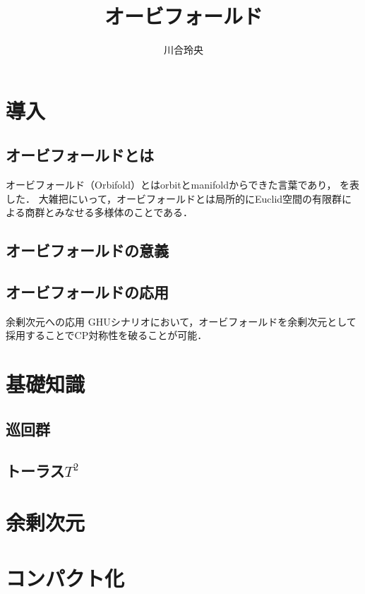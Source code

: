 \documentclass[dvipdfmx,uplatex]{jsarticle}
\numberwithin{theorem}{section}
\numberwithin{reibangou}{section}
\numberwithin{reidaibangou}{section}
\numberwithin{mondaibangou}{section}
\begin{document}
\title{オービフォールド}
\author{川合玲央}

\maketitle

\tableofcontents

\section{導入}

\subsection{オービフォールドとは}
オービフォールド（Orbifold）とはorbitとmanifoldからできた言葉であり，
を表した．
大雑把にいって，オービフォールドとは局所的にEuclid空間の有限群による商群とみなせる多様体のことである．

\subsection{オービフォールドの意義}

\subsection{オービフォールドの応用}
余剰次元への応用
GHUシナリオにおいて，オービフォールドを余剰次元として採用することでCP対称性を破ることが可能．

\section{基礎知識}

\subsection{巡回群}

\subsection{\texorpdfstring{トーラス$T^2$}{トーラスT2}}


\section{余剰次元}


\section{コンパクト化}
\end{document}
